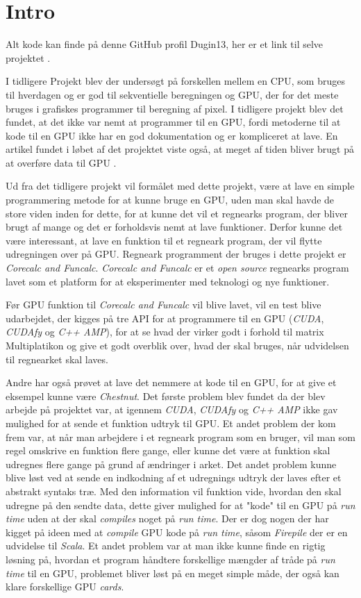 \section{Intro}
Alt kode kan finde på denne GitHub profil Dugin13, her er et link til selve projektet \cite{GitHubProjekt}.

I tidligere Projekt \cite{P9} blev der undersøgt på forskellen mellem en CPU, som bruges til hverdagen og er god til sekventielle beregningen og GPU, der for det meste bruges i grafiskes programmer til beregning af pixel. I tidligere projekt blev det fundet, at det ikke var nemt at programmer til en GPU, fordi metoderne til at kode til en GPU ikke har en god dokumentation og er kompliceret at lave. En artikel fundet i løbet af det projektet viste også, at meget af tiden bliver brugt på at overføre data til GPU \cite{lee2010debunking}. 

Ud fra det tidligere projekt vil formålet med dette projekt, være at lave en simple programmering metode for at kunne bruge en GPU, uden man skal havde de store viden inden for dette, for at kunne det vil et regnearks program, der bliver brugt af mange og det er forholdsvis nemt at lave funktioner. Derfor kunne det være interessant, at lave en funktion til et regneark program, der vil flytte udregningen over på GPU. Regneark programment der bruges i dette projekt er \textit{Corecalc and Funcalc}. \textit{Corecalc and Funcalc} er et \textit{open source} regnearks program lavet som et platform for at eksperimenter med teknologi og nye funktioner.

Før GPU funktion til \textit{Corecalc and Funcalc} vil blive lavet, vil en test blive udarbejdet, der kigges på tre API for at programmere til en GPU (\textit{CUDA}, \textit{CUDAfy} og \textit{C++ AMP}), for at se hvad der virker godt i forhold til matrix Multiplatikon og give et godt overblik over, hvad der skal bruges, når udvidelsen til regnearket skal laves.

Andre har også prøvet at lave det nemmere at kode til en GPU, for at give et eksempel kunne være \textit{Chestnut}\cite{Chestnut2012}. Det første problem blev fundet da der blev arbejde på projektet var, at igennem \textit{CUDA}, \textit{CUDAfy} og \textit{C++ AMP} ikke gav mulighed for at sende et funktion udtryk til GPU. Et andet problem der kom frem var, at når man arbejdere i et regneark program som en bruger, vil man som regel omskrive en funktion flere gange, eller kunne det være at funktion skal udregnes flere gange på grund af ændringer i arket. Det andet problem kunne blive løst ved at sende en indkodning af et udregnings udtryk der laves efter et abstrakt syntaks træ. Med den information vil funktion vide, hvordan den skal udregne på den sendte data, dette giver mulighed for at "kode" til en GPU på \textit{run time} uden at der skal \textit{compiles} noget på \textit{run time}. Der er dog nogen der har kigget på ideen med at \textit{compile} GPU kode på \textit{run time}, såsom \textit{Firepile} \cite{Firepile2011} der er en udvidelse til \textit{Scala}.
Et andet problem var at man ikke kunne finde en rigtig løsning på, hvordan et program håndtere forskellige mængder af tråde på \textit{run time} til en GPU, problemet bliver løst på en meget simple måde, der også kan klare forskellige GPU \textit{cards}.

